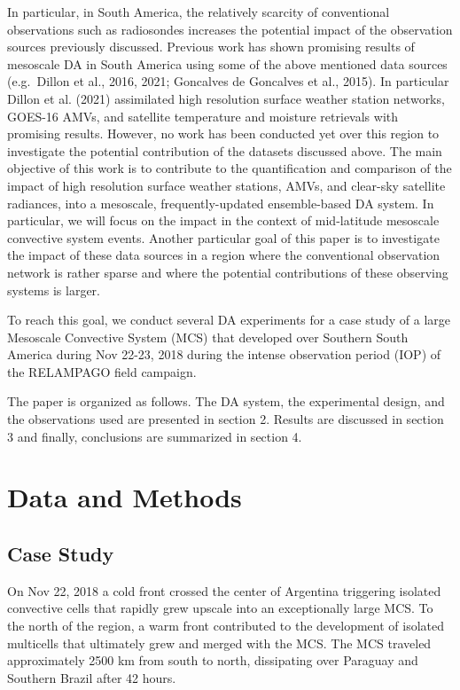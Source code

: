 \documentclass[authoryear,preprint,review,12pt]{elsarticle} %
\begin{document}
In particular, in South America, the relatively scarcity of conventional observations such as radiosondes increases the potential impact of the observation sources previously discussed. Previous work has shown promising results of mesoscale DA in South America using some of the above mentioned data sources (e.g.~Dillon et al., 2016, 2021; Goncalves de Goncalves et al., 2015). In particular Dillon et al. (2021) assimilated high resolution surface weather station networks, GOES-16 AMVs, and satellite temperature and moisture retrievals with promising results. However, no work has been conducted yet over this region to investigate the potential contribution of the datasets discussed above.
The main objective of this work is to contribute to the quantification and comparison of the impact of high resolution surface weather stations, AMVs, and clear-sky satellite radiances, into a mesoscale, frequently-updated ensemble-based DA system. In particular, we will focus on the impact in the context of mid-latitude mesoscale convective system events. Another particular goal of this paper is to investigate the impact of these data sources in a region where the conventional observation network is rather sparse and where the potential contributions of these observing systems is larger.

To reach this goal, we conduct several DA experiments for a case study of a large Mesoscale Convective System (MCS) that developed over Southern South America during Nov 22-23, 2018 during the intense observation period (IOP) of the RELAMPAGO field campaign.

The paper is organized as follows. The DA system, the experimental design, and the observations used are presented in section 2. Results are discussed in section 3 and finally, conclusions are summarized in section 4.

\hypertarget{data-and-methods}{%
\section{Data and Methods}\label{data-and-methods}}

\hypertarget{case-study}{%
\subsection{Case Study}\label{case-study}}

On Nov 22, 2018 a cold front crossed the center of Argentina triggering isolated convective cells that rapidly grew upscale into an exceptionally large MCS. To the north of the region, a warm front contributed to the development of isolated multicells that ultimately grew and merged with the MCS.
The MCS traveled approximately 2500 km from south to north, dissipating over Paraguay and Southern Brazil after 42 hours.
\end{document}
